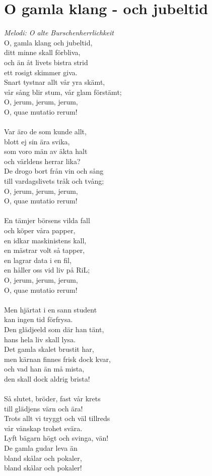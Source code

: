 \section{O gamla klang - och jubeltid}
\textit{Melodi: O alte Burschenherrlichkeit}
\vspace{2mm}\\
O, gamla klang och jubeltid,\\
ditt minne skall förbliva,\\
och än åt livets bistra strid\\
ett rosigt skimmer giva.\\
Snart tystnar allt vår yra skämt,\\
vår sång blir stum, vår glam förstämt;\\
O, jerum, jerum, jerum,\\
O, quae mutatio rerum!\\
\\
Var äro de som kunde allt,\\
blott ej sin ära svika,\\
som voro män av äkta halt\\
och världens herrar lika?\\
De drogo bort från vin och sång\\
till vardagslivets tråk och tvång;\\
O, jerum, jerum, jerum,\\
O, quae mutatio rerum!\\
\\
En tämjer börsens vilda fall\\
och köper våra papper,\\
en idkar maskinistens kall,\\
en mästrar volt så tapper,\\
en lagrar data i en fil,\\
en håller oss vid liv på RiL;\\
O, jerum, jerum, jerum,\\
O, quae mutatio rerum!\\
\\
Men hjärtat i en sann student\\
kan ingen tid förfrysa.\\
Den glädjeeld som där han tänt,\\
hans hela liv skall lysa.\\
Det gamla skalet brustit har,\\
men kärnan finnes frisk dock kvar,\\
och vad han än må mista,\\
den skall dock aldrig brista!\\
\\
Så slutet, bröder, fast vår krets\\
till glädjens värn och ära!\\
Trots allt vi tryggt och väl tillreds\\
vår vänskap trohet svära.\\
Lyft bägarn högt och svinga, vän!\\
De gamla gudar leva än\\
bland skålar och pokaler,\\
bland skålar och pokaler!

